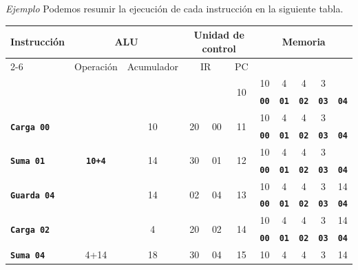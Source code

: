 \documentclass[11pt,spanish]{article}
\providecommand{\tabularnewline}{\\}
\begin{document}
\begin{bclogo}[noborder=true, couleurBarre=celestialblue,arrondi =0.1, couleur =anti-flashwhite, logo=\bccrayon, marge =10]{\textit{Ejemplo}}
Podemos resumir la ejecución de cada instrucción en la siguiente tabla.
\cite{key-2}
\begin{center}
\begin{longtable}[c]{|l|c|c|c|c|c|c|c|c|c|c|}
\hline 
\multirow{2}{*}{Instrucción} & \multicolumn{2}{c|}{ALU} & \multicolumn{3}{c|}{Unidad de control} & \multicolumn{5}{c|}{Memoria}\tabularnewline
\cline{2-6} \cline{3-6} \cline{4-6} \cline{5-6} \cline{6-6} 
 & Operación & Acumulador & \multicolumn{2}{c|}{IR} & PC & \multicolumn{5}{c|}{}\tabularnewline
\hline 
\multirow{2}{*}{} & \multirow{2}{*}{} & \multirow{2}{*}{} & \multirow{2}{*}{} & \multirow{2}{*}{} & \multirow{2}{*}{10} & 10 & 4 & 4 & 3 & \tabularnewline
\cline{7-11} \cline{8-11} \cline{9-11} \cline{10-11} \cline{11-11} 
 &  &  &  &  &  & \texttt{\textbf{00}} & \texttt{\textbf{01}} & \texttt{\textbf{02}} & \texttt{\textbf{03}} & \texttt{\textbf{04}}\tabularnewline
\hline 
\multirow{2}{*}{\texttt{\textbf{Carga 00}}} & \multirow{2}{*}{} & \multirow{2}{*}{10} & \multirow{2}{*}{20} & \multirow{2}{*}{00} & \multirow{2}{*}{11} & 10 & 4 & 4 & 3 & \tabularnewline
\cline{7-11} \cline{8-11} \cline{9-11} \cline{10-11} \cline{11-11} 
 &  &  &  &  &  & \texttt{\textbf{00}} & \texttt{\textbf{01}} & \texttt{\textbf{02}} & \texttt{\textbf{03}} & \texttt{\textbf{04}}\tabularnewline
\hline 
\multirow{2}{*}{\texttt{\textbf{Suma 01}}} & \multirow{2}{*}{\texttt{\textbf{10+4}}} & \multirow{2}{*}{14} & \multirow{2}{*}{30} & \multirow{2}{*}{01} & \multirow{2}{*}{12} & 10 & 4 & 4 & 3 & \tabularnewline
\cline{7-11} \cline{8-11} \cline{9-11} \cline{10-11} \cline{11-11} 
 &  &  &  &  &  & \texttt{\textbf{00}} & \texttt{\textbf{01}} & \texttt{\textbf{02}} & \texttt{\textbf{03}} & \texttt{\textbf{04}}\tabularnewline
\hline 
\multirow{2}{*}{\texttt{\textbf{Guarda 04}}} & \multirow{2}{*}{} & \multirow{2}{*}{14} & \multirow{2}{*}{02} & \multirow{2}{*}{04} & \multirow{2}{*}{13} & 10 & 4 & 4 & 3 & 14\tabularnewline
\cline{7-11} \cline{8-11} \cline{9-11} \cline{10-11} \cline{11-11} 
 &  &  &  &  &  & \texttt{\textbf{00}} & \texttt{\textbf{01}} & \texttt{\textbf{02}} & \texttt{\textbf{03}} & \texttt{\textbf{04}}\tabularnewline
\hline 
\multirow{2}{*}{\texttt{\textbf{Carga 02}}} & \multirow{2}{*}{} & \multirow{2}{*}{4} & \multirow{2}{*}{20} & \multirow{2}{*}{02} & \multirow{2}{*}{14} & 10 & 4 & 4 & 3 & 14\tabularnewline
\cline{7-11} \cline{8-11} \cline{9-11} \cline{10-11} \cline{11-11} 
 &  &  &  &  &  & \texttt{\textbf{00}} & \texttt{\textbf{01}} & \texttt{\textbf{02}} & \texttt{\textbf{03}} & \texttt{\textbf{04}}\tabularnewline
\hline 
\multirow{2}{*}{\texttt{\textbf{Suma 04}}} & \multirow{2}{*}{4+14} & \multirow{2}{*}{18} & \multirow{2}{*}{30} & \multirow{2}{*}{04} & \multirow{2}{*}{15} & 10 & 4 & 4 & 3 & 14\tabularnewline

\end{longtable}
\end{center}
\end{bclogo}
\end{document}
